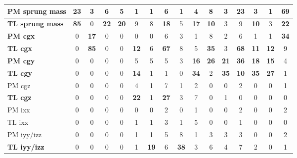 \begin{table}[H]
\begin{tabular}{|l|c|c|c|c|c|c|c|c|c|c|c|c|c|c|c|}
\hline
\textcolor[rgb]{0.000, 0.447, 0.698}{\textbf{PM sprung mass}} & \textbf{23} & 3 & 6 & 5 & 1 & 1 & 6 & 1 & 4 & 8 & 3 & \textbf{23} & 3 & 1 & \textcolor[rgb]{0.000, 0.447, 0.698}{\textbf{69}} \\
\hline
\textcolor[rgb]{0.000, 0.447, 0.698}{\textbf{TL sprung mass}} & \textcolor[rgb]{0.000, 0.447, 0.698}{\textbf{85}} & 0 & \textbf{22} & \textbf{20} & 9 & 8 & \textbf{18} & 5 & \textbf{17} & \textbf{10} & 3 & 9 & \textbf{10} & 3 & \textbf{22} \\
\hline
\textcolor[rgb]{0.000, 0.620, 0.451}{\textbf{PM \gls{cgx}}} & 0 & \textbf{17} & 0 & 0 & 0 & 0 & 6 & 3 & 1 & 8 & 2 & 6 & 1 & 1 & \textcolor[rgb]{0.000, 0.620, 0.451}{\textbf{34}} \\
\hline
\textcolor[rgb]{0.000, 0.447, 0.698}{\textbf{TL \gls{cgx}}} & 0 & \textcolor[rgb]{0.000, 0.447, 0.698}{\textbf{85}} & 0 & 0 & \textbf{12} & 6 & \textcolor[rgb]{0.000, 0.447, 0.698}{\textbf{67}} & 8 & 5 & \textcolor[rgb]{0.000, 0.620, 0.451}{\textbf{35}} & 3 & \textcolor[rgb]{0.000, 0.447, 0.698}{\textbf{68}} & \textbf{11} & \textbf{12} & 9 \\
\hline
\textcolor[rgb]{0.000, 0.620, 0.451}{\textbf{PM \gls{cgy}}} & 0 & 0 & 0 & 0 & 5 & 5 & 5 & 3 & \textbf{16} & \textcolor[rgb]{0.000, 0.620, 0.451}{\textbf{26}} & \textbf{21} & \textcolor[rgb]{0.000, 0.620, 0.451}{\textbf{36}} & \textbf{18} & \textbf{15} & 4 \\
\hline
\textcolor[rgb]{0.000, 0.620, 0.451}{\textbf{TL \gls{cgy}}} & 0 & 0 & 0 & 0 & \textbf{14} & 1 & 1 & 0 & \textcolor[rgb]{0.000, 0.620, 0.451}{\textbf{34}} & 2 & \textcolor[rgb]{0.000, 0.620, 0.451}{\textbf{35}} & \textbf{10} & \textcolor[rgb]{0.000, 0.620, 0.451}{\textbf{35}} & \textcolor[rgb]{0.000, 0.620, 0.451}{\textbf{27}} & 1 \\
\hline
PM \gls{cgz} & 0 & 0 & 0 & 0 & 4 & 1 & 7 & 1 & 2 & 0 & 0 & 2 & 0 & 0 & 1 \\
\hline
\textcolor[rgb]{0.000, 0.620, 0.451}{\textbf{TL \gls{cgz}}} & 0 & 0 & 0 & 0 & \textbf{22} & 1 & \textcolor[rgb]{0.000, 0.620, 0.451}{\textbf{27}} & 3 & 7 & 0 & 1 & 0 & 0 & 0 & 0 \\
\hline
PM \gls{ixx} & 0 & 0 & 0 & 0 & 0 & 0 & 2 & 0 & 1 & 0 & 0 & 2 & 0 & 0 & 2 \\
\hline
TL \gls{ixx} & 0 & 0 & 0 & 0 & 1 & 1 & 3 & 1 & 5 & 0 & 0 & 1 & 0 & 0 & 0 \\
\hline
PM \gls{iyy}/\gls{izz} & 0 & 0 & 0 & 0 & 1 & 1 & 5 & 8 & 1 & 3 & 3 & 3 & 0 & 0 & 2 \\
\hline
\textcolor[rgb]{0.000, 0.620, 0.451}{\textbf{TL \gls{iyy}/\gls{izz}}} & 0 & 0 & 0 & 0 & 1 & \textbf{19} & 6 & \textcolor[rgb]{0.000, 0.620, 0.451}{\textbf{38}} & 3 & 6 & 4 & 7 & 2 & 0 & 1 \\

\end{tabular}
\end{table}
